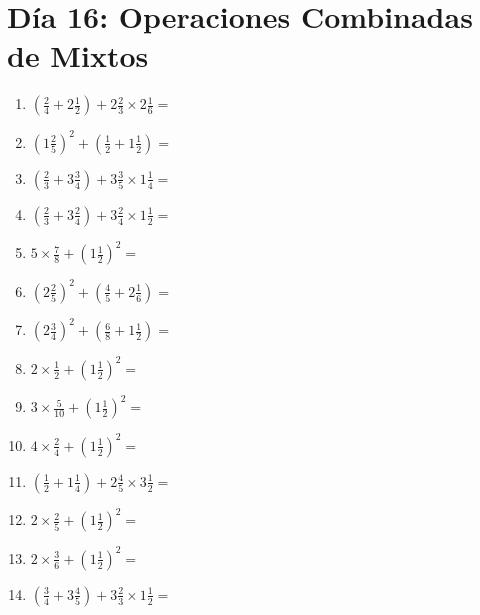 \documentclass[12pt]{article}
\begin{document}
\section*{Día 16: Operaciones Combinadas de Mixtos}
\begin{enumerate}
\item \large $ (\frac{2}{4} + 2 \frac{1}{2}) + 2 \frac{2}{3} \times 2 \frac{1}{6} = $ \vspace{1.8cm}
\item \large $ (1 \frac{2}{5})^2 + (\frac{1}{2} + 1 \frac{1}{2}) = $ \vspace{1.8cm}
\item \large $ (\frac{2}{3} + 3 \frac{3}{4}) + 3 \frac{3}{5} \times 1 \frac{1}{4} = $ \vspace{1.8cm}
\item \large $ (\frac{2}{3} + 3 \frac{2}{4}) + 3 \frac{2}{4} \times 1 \frac{1}{2} = $ \vspace{1.8cm}
\item \large $ 5 \times \frac{7}{8} + (1 \frac{1}{2})^2 = $ \vspace{1.8cm}
\item \large $ (2 \frac{2}{5})^2 + (\frac{4}{5} + 2 \frac{1}{6}) = $ \vspace{1.8cm}
\item \large $ (2 \frac{3}{4})^2 + (\frac{6}{8} + 1 \frac{1}{2}) = $ \vspace{1.8cm}
\item \large $ 2 \times \frac{1}{2} + (1 \frac{1}{2})^2 = $ \vspace{1.8cm}
\item \large $ 3 \times \frac{5}{10} + (1 \frac{1}{2})^2 = $ \vspace{1.8cm}
\item \large $ 4 \times \frac{2}{4} + (1 \frac{1}{2})^2 = $ \vspace{1.8cm}
\newpage
\item \large $ (\frac{1}{2} + 1 \frac{1}{4}) + 2 \frac{4}{5} \times 3 \frac{1}{2} = $ \vspace{1.8cm}
\item \large $ 2 \times \frac{2}{5} + (1 \frac{1}{2})^2 = $ \vspace{1.8cm}
\item \large $ 2 \times \frac{3}{6} + (1 \frac{1}{2})^2 = $ \vspace{1.8cm}
\item \large $ (\frac{3}{4} + 3 \frac{4}{5}) + 3 \frac{2}{3} \times 1 \frac{1}{2} = $ \vspace{1.8cm}

\end{enumerate}
\end{document}
